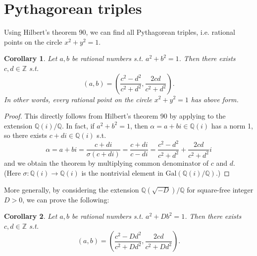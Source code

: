 \documentclass{article}
\newcommand{\Gal}{\mathrm{Gal}}
\newtheorem{corollary}{Corollary}
\begin{document}
\section{Pythagorean triples}
Using Hilbert's theorem 90, we can find all Pythagorean triples, i.e. rational points on the circle $x^{2} + y^{2} =1$. 
\begin{corollary}
Let $a, b$ be rational numbers s.t. $a^{2}+ b^{2} =1 $. Then there exists $c, d\in \mathbb{Z}$ s.t. 
$$
 (a, b) = \left( \frac{c^{2}-d^{2}}{c^{2}+d^{2}}, \frac{2cd}{c^{2}+d^{2}}\right).
$$
In other words, every rational point on the circle $x^{2} + y^{2} = 1$ has above form. 
\end{corollary}
\begin{proof}
This directly follows from Hilbert's theorem 90 by applying to the extension $\mathbb{Q}(i)/\mathbb{Q}$. 
In fact, if $a^{2} + b^{2} = 1$, then $\alpha = a+bi\in \mathbb{Q}(i)$ has a norm 1, so there exists $c+di\in \mathbb{Q}(i)$ s.t. 
$$
\alpha = a+bi = \frac{c+di}{\sigma(c+di)} = \frac{c+di}{c-di} = \frac{c^{2}-d^{2}}{c^{2} + d^{2}} + \frac{2cd}{c^{2} + d^{2}}i
$$
and we obtain the theorem by multiplying common denominator of $c$ and $d$. (Here $\sigma : \mathbb{Q}(i)\to \mathbb{Q}(i)$ is the nontrivial element in $\Gal(\mathbb{Q}(i)/\mathbb{Q})$.) 
\end{proof}
More generally, by considering the extension $\mathbb{Q}(\sqrt{-D})/\mathbb{Q}$ for square-free integer $D>0$, we can prove the following:
\begin{corollary}
Let $a, b$ be rational numbers s.t. $a^{2} +Db^{2} = 1$. 
Then there exists $c, d\in\mathbb{Z}$ s.t. 
$$
(a, b) = \left(\frac{c^{2} - Dd^{2}}{c^{2} + Dd^{2}}, \frac{2cd}{c^{2} + Dd^{2}}\right).
$$
\end{corollary}
\end{document}
